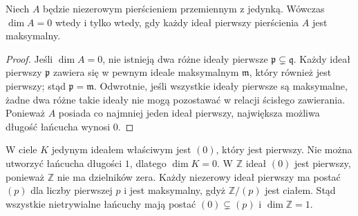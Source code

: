 \begin{wniosek}
\label{aa:cor:krull-dim-zero}
Niech $A$ będzie niezerowym pierścieniem przemiennym z jedynką.
Wówczas $\dim A=0$ wtedy i tylko wtedy, gdy każdy ideał pierwszy
pierścienia $A$ jest maksymalny.
\end{wniosek}
\begin{proof}
Jeśli $\dim A=0$, nie istnieją dwa różne ideały pierwsze
$\mathfrak p\subsetneq\mathfrak q$. Każdy ideał pierwszy
$\mathfrak p$ zawiera się w pewnym ideale maksymalnym
$\mathfrak m$, który również jest pierwszy; stąd
$\mathfrak p=\mathfrak m$. Odwrotnie, jeśli wszystkie ideały
pierwsze są maksymalne, żadne dwa różne takie ideały nie mogą
pozostawać w relacji ścisłego zawierania. Ponieważ $A$ posiada
co najmniej jeden ideał pierwszy, największa możliwa długość
łańcucha wynosi $0$.
\end{proof}
\begin{przyklad}\label{aa:prz:krull-field-integers}
W ciele $K$ jedynym ideałem właściwym jest $(0)$, który jest
pierwszy. Nie można utworzyć łańcucha długości $1$, dlatego
$\dim K=0$.
W $\mathbb Z$ ideał $(0)$ jest pierwszy, ponieważ $\mathbb Z$
nie ma dzielników zera. Każdy niezerowy ideał pierwszy ma postać
$(p)$ dla liczby pierwszej $p$ i jest maksymalny, gdyż
$\mathbb Z/(p)$ jest ciałem. Stąd wszystkie nietrywialne łańcuchy
mają postać $(0)\subsetneq(p)$ i $\dim\mathbb Z=1$.
\end{przyklad}

